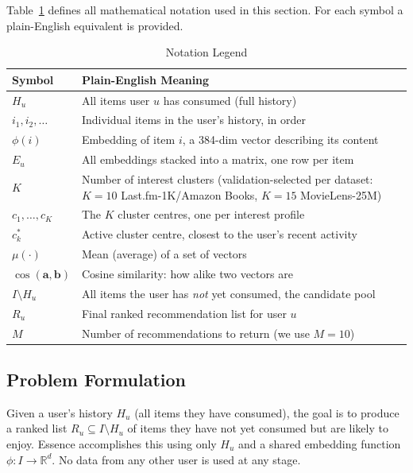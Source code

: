 \documentclass[11pt,a4paper]{article}
\begin{document}
Table~\ref{tab:notation} defines all mathematical notation used in this
section. For each symbol a plain-English equivalent is provided.

\begin{table}[H]
\centering
\caption{Notation Legend}
\label{tab:notation}
\begin{tabular}{ll}
\toprule
\textbf{Symbol} & \textbf{Plain-English Meaning} \\
\midrule
$H_u$                     & All items user $u$ has consumed (full history) \\
$i_1, i_2, \ldots$        & Individual items in the user's history, in order \\
$\phi(i)$                 & Embedding of item $i$, a 384-dim vector describing its content \\
$E_u$                     & All embeddings stacked into a matrix, one row per item \\
$K$                       & Number of interest clusters (validation-selected per dataset: $K=10$ Last.fm-1K/Amazon Books, $K=15$ MovieLens-25M) \\
$c_1, \ldots, c_K$        & The $K$ cluster centres, one per interest profile \\
$c_k^*$                   & Active cluster centre, closest to the user's recent activity \\
$\mu(\cdot)$              & Mean (average) of a set of vectors \\
$\cos(\mathbf{a},\mathbf{b})$ & Cosine similarity: how alike two vectors are \\
$I \setminus H_u$         & All items the user has \emph{not} yet consumed, the candidate pool \\
$R_u$                     & Final ranked recommendation list for user $u$ \\
$M$                       & Number of recommendations to return (we use $M=10$) \\
\bottomrule
\end{tabular}
\end{table}

\subsection{Problem Formulation}
Given a user's history $H_u$ (all items they have consumed), the
goal is to produce a ranked list $R_u \subseteq I \setminus H_u$ of items
they have not yet consumed but are likely to enjoy. Essence accomplishes this
using only $H_u$ and a shared embedding function $\phi: I \to \mathbb{R}^d$.
No data from any other user is used at any stage.
\end{document}
